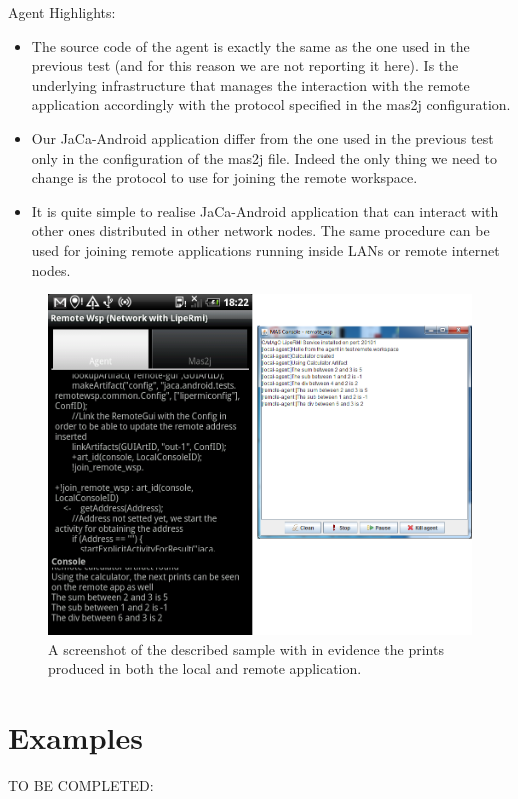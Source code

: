 \documentclass[11pt]{report}
\newcommand\labelfig[1]{\label{fig:#1}}
\newcommand\tbc[1]{TO BE COMPLETED: \emph{#1}}
\newcommand{\jaca}{\mbox{\sf{JaCa}}}
\newcommand{\cartago}{\mbox{\sf{CArtAgO}}}
\newcommand{\jacandroid}{\textsf{JaCa-Android}}
\begin{document}
%
\noindent Agent Highlights:

\begin{itemize}
%
\item The source code of the agent is exactly the same as the one used in the previous test (and for this reason we are not reporting it here). Is the underlying \cartago{} infrastructure that manages the interaction with the remote application accordingly with the protocol specified in the \textsf{mas2j} configuration.
%
\item Our \jacandroid{} application differ from the one used in the previous test only in the configuration of the \textsf{mas2j} file. Indeed the only thing we need to change is the protocol to use for joining the remote workspace.
%
\item It is quite simple to realise \jacandroid{} application that can interact with other \jaca{} ones distributed in other network nodes. The same procedure can be used for joining remote applications running inside LANs or remote internet nodes.
%
\end{itemize}
 

\begin{figure}[h!]
\begin{center}
\includegraphics[width=.9\linewidth]{images/test_remote2_gui.png}
\end{center}
\caption{A screenshot of the described sample with in evidence the prints produced in both the local and remote application.}
\labelfig{remote2}
\end{figure}



\chapter{Examples}
\tbc{}
\end{document}
